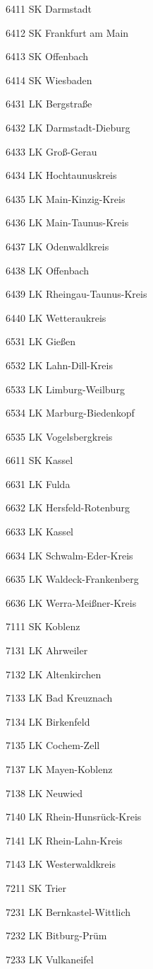 6411  SK Darmstadt

6412  SK Frankfurt am Main

6413  SK Offenbach

6414  SK Wiesbaden

6431  LK Bergstraße

6432  LK Darmstadt-Dieburg

6433  LK Groß-Gerau

6434  LK Hochtaunuskreis

6435  LK Main-Kinzig-Kreis

6436  LK Main-Taunus-Kreis

6437  LK Odenwaldkreis

6438  LK Offenbach

6439  LK Rheingau-Taunus-Kreis

6440  LK Wetteraukreis

6531  LK Gießen

6532  LK Lahn-Dill-Kreis

6533  LK Limburg-Weilburg

6534  LK Marburg-Biedenkopf

6535  LK Vogelsbergkreis

6611  SK Kassel

6631  LK Fulda

6632  LK Hersfeld-Rotenburg

6633  LK Kassel

6634  LK Schwalm-Eder-Kreis

6635  LK Waldeck-Frankenberg

6636  LK Werra-Meißner-Kreis

7111  SK Koblenz

7131  LK Ahrweiler

7132  LK Altenkirchen

7133  LK Bad Kreuznach

7134  LK Birkenfeld

7135  LK Cochem-Zell

7137  LK Mayen-Koblenz

7138  LK Neuwied

7140  LK Rhein-Hunsrück-Kreis

7141  LK Rhein-Lahn-Kreis

7143  LK Westerwaldkreis

7211  SK Trier

7231  LK Bernkastel-Wittlich

7232  LK Bitburg-Prüm

7233  LK Vulkaneifel


